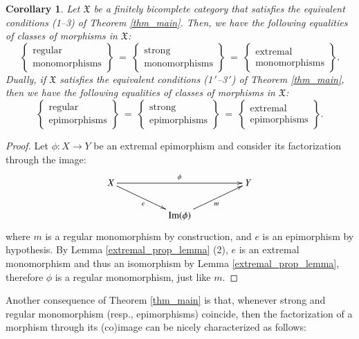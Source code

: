 \documentclass[12pt]{article}
\newtheorem{corollary}[lemma]{Corollary}
\theoremstyle{definition}
\def\X{\mathfrak X}
\def\Im{\mathrm{Im}}
\numberwithin{equation}{section}
\begin{document}
\begin{corollary}\label{coro_many_classes_usually_coincide}
Let $\X$ be a finitely bicomplete category that satisfies the equivalent conditions (1--3) of Theorem \ref{thm_main}. Then, we have the following equalities of classes of morphisms in $\X$:
\[
\left\{ \begin{matrix}\text{regular}\\\text{monomorphisms}\end{matrix}\right\}\ \overset{}=\ \left\{ \begin{matrix}\text{strong}\\\text{monomorphisms}\end{matrix}\right\}\ \overset{}=\ \left\{ \begin{matrix}\text{extremal}\\\text{monomorphisms}\end{matrix}\right\}.
\]
Dually, if $\X$ satisfies the equivalent conditions (1\,$'$--3\,$'$) of Theorem \ref{thm_main}, then we have the following equalities of classes of morphisms in $\X$:
\[
\left\{ \begin{matrix}\text{regular}\\\text{epimorphisms}\end{matrix}\right\}\ \overset{}=\ \left\{ \begin{matrix}\text{strong}\\\text{epimorphisms}\end{matrix}\right\}\ \overset{}=\ \left\{ \begin{matrix}\text{extremal}\\\text{epimorphisms}\end{matrix}\right\}.
\]
\end{corollary}
\begin{proof}
Let $\phi\colon X\to Y$ be an extremal epimorphism and consider its factorization through the image: 
\[
\xymatrix@R=20pt@C=50pt{
X\ar[rr]^{\phi}\ar[dr]_e&&Y\\
&\Im(\phi)\ar[ur]_m
}
\] 
where $m$ is a regular monomorphism by construction, and $e$ is an epimorphism by hypothesis. By Lemma \ref{extremal_prop_lemma} (2), $e$ is an extremal monomorphism and thus an isomorphism by Lemma \ref{extremal_prop_lemma}, therefore $\phi$ is a regular monomorphism, just like $m$.
\end{proof}

Another consequence of Theorem \ref{thm_main} is that, whenever strong and regular  monomorphism (resp., epimorphisms) coincide, then the factorization of a morphism through its (co)image can be nicely characterized as follows:
\end{document}
